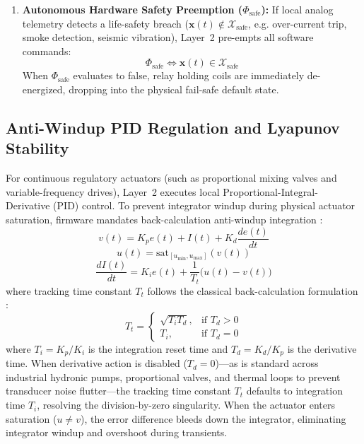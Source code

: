 \begin{enumerate}
    \item \textbf{Autonomous Hardware Safety Preemption ($\Phi_{\mathrm{safe}}$):} If local analog telemetry detects a life-safety breach ($\mathbf{x}(t) \notin \mathcal{X}_{\mathrm{safe}}$, e.g. over-current trip, smoke detection, seismic vibration), Layer~2 pre-empts all software commands:
    \begin{equation}
    \Phi_{\mathrm{safe}} \iff \mathbf{x}(t) \in \mathcal{X}_{\mathrm{safe}}
    \label{eq:l2_phi_safe}
    \end{equation}
    When $\Phi_{\mathrm{safe}}$ evaluates to false, relay holding coils are immediately de-energized, dropping into the physical fail-safe default state.
\end{enumerate}

\subsection{Anti-Windup PID Regulation and Lyapunov Stability}

For continuous regulatory actuators (such as proportional mixing valves and variable-frequency drives), Layer~2 executes local Proportional-Integral-Derivative (PID) control. To prevent integrator windup during physical actuator saturation, firmware mandates back-calculation anti-windup integration \parencite{astrom2008feedback}:
\begin{equation}
v(t) = K_p e(t) + I(t) + K_d \frac{de(t)}{dt}
\label{eq:l2_pid_raw}
\end{equation}
\begin{equation}
u(t) = \mathrm{sat}_{[u_{\min}, u_{\max}]}(v(t))
\label{eq:l2_pid_sat}
\end{equation}
\begin{equation}
\frac{dI(t)}{dt} = K_i e(t) + \frac{1}{T_t} \big(u(t) - v(t)\big)
\label{eq:l2_pid_antiwindup}
\end{equation}
where tracking time constant $T_t$ follows the classical back-calculation formulation \parencite{astrom2008feedback}:
\begin{equation}
T_t = \left\{ \begin{array}{ll}
\sqrt{T_i T_d}, & \mbox{if } T_d > 0 \\
T_i, & \mbox{if } T_d = 0
\end{array} \right.
\label{eq:l2_pid_tracking_const}
\end{equation}
where $T_i = K_p / K_i$ is the integration reset time and $T_d = K_d / K_p$ is the derivative time. When derivative action is disabled ($T_d = 0$)---as is standard across industrial hydronic pumps, proportional valves, and thermal loops to prevent transducer noise flutter---the tracking time constant $T_t$ defaults to integration time $T_i$, resolving the division-by-zero singularity. When the actuator enters saturation ($u \neq v$), the error difference bleeds down the integrator, eliminating integrator windup and overshoot during transients.


